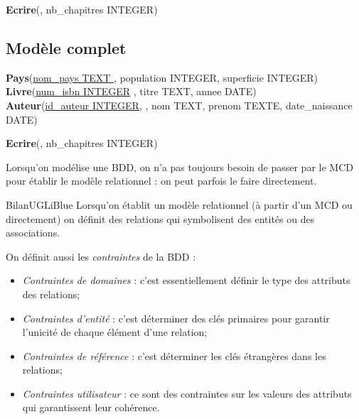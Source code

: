 \textbf{Ecrire}(\uline{}, nb\_chapitres INTEGER)\\

\subsection{Modèle complet}


\textbf{Pays}(\uline{nom\_pays TEXT }, population INTEGER, superficie INTEGER)\\

\textbf{Livre}(\uline{num\_isbn INTEGER} , titre TEXT, annee DATE)\\

{\scriptsize\textbf{Auteur}(\uline{id\_auteur INTEGER},  , nom TEXT, prenom TEXTE, date\_naissance DATE)\\}

\textbf{Ecrire}(\uline{}, nb\_chapitres INTEGER)\\


\begin{remarque}[]
	Lorsqu'on modélise une BDD, on n'a pas toujours besoin de passer par le MCD pour établir le modèle relationnel : on peut parfois le faire directement.
\end{remarque}

\begin{encadrecolore}{Bilan}{UGLiBlue}
	Lorsqu'on établit un modèle relationnel (à partir d'un MCD ou directement) on définit des relations qui symbolisent des entités ou des associations.
	
	On définit aussi les \textit{contraintes} de la BDD :
	\begin{itemize}
		\item	\textit{Contraintes de domaines} : c'est essentiellement définir le type des attributs des relations;
		\item	\textit{Contraintes d'entité} : c'est déterminer des clés primaires pour garantir l'unicité de chaque élément d'une relation;
		\item 	\textit{Contraintes de référence} : c'est déterminer les clés étrangères dans les relations;
		\item 	\textit{Contraintes utilisateur} : ce sont des contraintes sur les valeurs des attributs qui garantissent leur cohérence.
	\end{itemize}
\end{encadrecolore}


